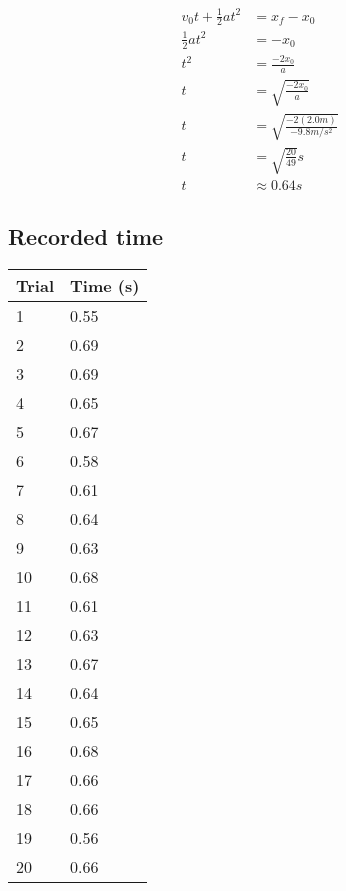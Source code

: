 \documentclass[11pt, letterpaper, includehead]{article}
\begin{document}

  \begin{align*}
    v_0t + \frac{1}{2}at^2 &= x_f - x_0\\
    \frac{1}{2}at^2 &= -x_0\\
    t^2 &= \frac{-2x_0}{a}\\
    t &= \sqrt{\frac{-2x_0}{a}}\\
    t &= \sqrt{\frac{-2(2.0m)}{-9.8m/s^2}}\\
    t &= \sqrt{\frac{20}{49}}s\\
    t &\approx 0.64s
  \end{align*}

  \subsection{Recorded time} %
    \begin{tabular}[H]{| m{2cm} | m{2cm} |}
      \hline
      \textbf{Trial} & \textbf{Time (s)} \\ [0.5ex]
      \hline \hline
        1 & 0.55 \\ 
         \hline
        2 & 0.69 \\ 
         \hline
        3 & 0.69 \\ 
         \hline
        4 & 0.65 \\ 
         \hline
        5 & 0.67 \\ 
         \hline
        6 & 0.58 \\ 
         \hline
        7 & 0.61 \\ 
         \hline
        8 & 0.64 \\ 
         \hline
        9 & 0.63 \\ 
         \hline
        10 & 0.68 \\ 
         \hline
        11 & 0.61 \\ 
         \hline
        12 & 0.63 \\ 
         \hline
        13 & 0.67 \\ 
         \hline
        14 & 0.64 \\ 
         \hline
        15 & 0.65 \\ 
         \hline
        16 & 0.68 \\ 
         \hline
        17 & 0.66 \\ 
         \hline
        18 & 0.66 \\ 
         \hline
        19 & 0.56 \\ 
         \hline
        20 & 0.66 \\ 
         \hline
  \end{tabular} 
 
\end{document}
